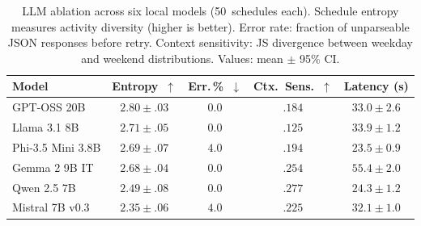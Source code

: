 \begin{table}[t]
  \centering
  \caption{LLM ablation across six local models (50~schedules each).
  Schedule entropy measures activity diversity (higher is better).
  Error rate: fraction of unparseable JSON responses before retry.
  Context sensitivity: JS divergence between weekday and weekend
  distributions.  Values: mean $\pm$ 95\% CI.}
  \label{tab:llm-ablation}
  \small
  \begin{tabular}{l c c c c}
    \toprule
    {Model} & {Entropy~$\uparrow$} & {Err.\,\%~$\downarrow$} & {Ctx.\ Sens.~$\uparrow$} & {Latency (s)} \\
    \midrule
    GPT-OSS 20B        & $2.80{\pm}.03$ & $0.0$ & $.184$ & $33.0{\pm}2.6$ \\
    Llama 3.1 8B       & $2.71{\pm}.05$ & $0.0$ & $.125$ & $33.9{\pm}1.2$ \\
    Phi-3.5 Mini 3.8B  & $2.69{\pm}.07$ & $4.0$ & $.194$ & $23.5{\pm}0.9$ \\
    Gemma 2 9B IT      & $2.68{\pm}.04$ & $0.0$ & $.254$ & $55.4{\pm}2.0$ \\
    Qwen 2.5 7B        & $2.49{\pm}.08$ & $0.0$ & $.277$ & $24.3{\pm}1.2$ \\
    Mistral 7B v0.3    & $2.35{\pm}.06$ & $4.0$ & $.225$ & $32.1{\pm}1.0$ \\
    \bottomrule
  \end{tabular}
\end{table}
